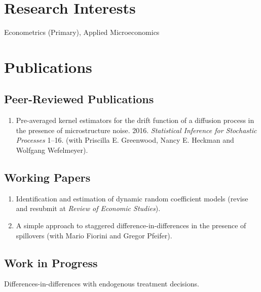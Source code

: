 \documentclass[10pt,letterpaper]{article}
\renewenvironment{itemize}{
  \begin{list}{}{
      \setlength{\leftmargin}{1.5em}
      \setlength{\itemsep}{0.25em}
      \setlength{\parskip}{0pt}
      \setlength{\parsep}{0.25em}
    }
}{
  \end{list}
}
\begin{document}
\section*{Research Interests}

Econometrics (Primary), Applied Microeconomics

\section*{Publications}

\subsection*{Peer-Reviewed Publications}

\begin{enumerate}
\item
  Pre-averaged kernel estimators for the drift function of a diffusion process in the presence of microstructure noise. 
  2016.
  \textit{Statistical Inference for Stochastic Processes} 1--16.
  (with Priscilla E. Greenwood, Nancy E. Heckman and Wolfgang Wefelmeyer).
\end{enumerate}

\subsection*{Working Papers}

\begin{enumerate}[resume]
\item Identification and estimation of dynamic random coefficient models (revise and resubmit at \emph{Review of Economic Studies}).
\item A simple approach to staggered difference-in-differences in the presence of spillovers (with Mario Fiorini and Gregor Pfeifer).

\end{enumerate}

\subsection*{Work in Progress}

\begin{itemize}
\item Differences-in-differences with endogenous treatment decisions.
\end{itemize}
\end{document}
